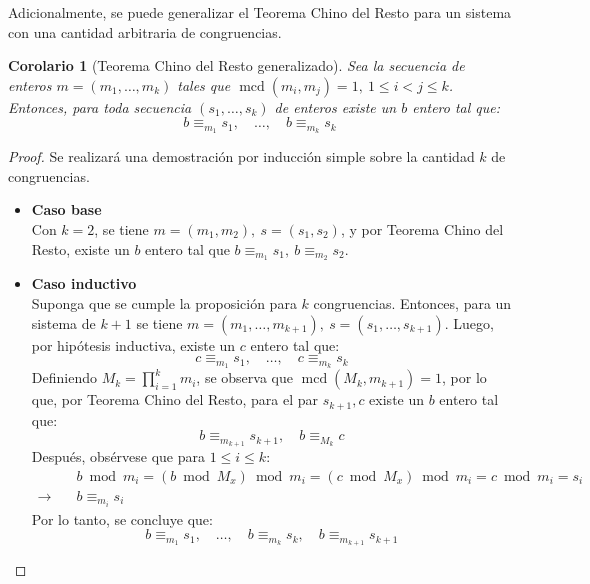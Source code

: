 \documentclass[hidelinks, 12pt]{article}
\DeclareMathOperator{\mcd}{mcd}
\newcommand{\lora}{\longrightarrow}
\newtheorem*{corollary}{Corolario}
\begin{document}
\begin{enumerate}
    Adicionalmente, se puede generalizar el Teorema Chino del Resto para un sistema con una cantidad arbitraria de congruencias.
    \begin{corollary}[Teorema Chino del Resto generalizado]
        Sea la secuencia de enteros $m=(m_1,\dots,m_k)$ tales que $\mcd(m_i,m_j)=1,~1\leq i<j\leq k$. Entonces, para toda secuencia $(s_1,\dots,s_k)$ de enteros existe un $b$ entero tal que:
        \[b\equiv_{m_1}s_1,\quad\dots,\quad b\equiv_{m_k}s_k\]
    \end{corollary}
    \begin{proof}
        Se realizará una demostración por inducción simple sobre la cantidad $k$ de congruencias.
        \begin{itemize}
            \item[]\textbf{Caso base} \\
            Con $k=2$, se tiene $m=(m_1,m_2),~s=(s_1,s_2)$, y por Teorema Chino del Resto, existe un $b$ entero tal que $b\equiv_{m_1}s_1,~b\equiv_{m_2}s_2$.
            \item[]\textbf{Caso inductivo} \\
            Suponga que se cumple la proposición para $k$ congruencias. Entonces, para un sistema de $k+1$ se tiene $m=(m_1,\dots,m_{k+1}),~s=(s_1,\dots,s_{k+1})$. Luego, por hipótesis inductiva, existe un $c$ entero tal que:
            \[c\equiv_{m_1}s_1,\quad\dots,\quad c\equiv_{m_k}s_k\]
            Definiendo $M_k=\prod^k_{i=1}m_i$, se observa que $\mcd(M_k,m_{k+1})=1$, por lo que, por Teorema Chino del Resto, para el par $s_{k+1},c$ existe un $b$ entero tal que:
            \[b\equiv_{m_{k+1}}s_{k+1},\quad b\equiv_{M_k}c\]
            Después, obsérvese que para $1\leq i\leq k$:
            \begin{align*}
                &b\bmod m_i=(b\bmod M_x)\bmod m_i=(c\bmod M_x)\bmod m_i=c\bmod m_i=s_i \\
                \lora\quad &b\equiv_{m_i}s_i
            \end{align*}
            Por lo tanto, se concluye que:
            \[b\equiv_{m_1}s_1,\quad\dots,\quad b\equiv_{m_k}s_k,\quad b\equiv_{m_{k+1}}s_{k+1}\]
        \end{itemize}
    \end{proof}


\end{enumerate}
\end{document}
